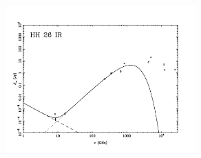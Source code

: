 \documentclass[9pt]{extarticle}   	%
\begin{document}
\begin{figure}[htbp]
\begin{center}
\includegraphics[width=0.65\textwidth]{plots/HH26IR.pdf}
\label{default}
\end{center}
\end{figure}

\clearpage
\end{document}
